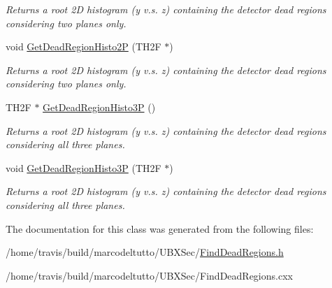 \begin{DoxyCompactItemize}
\begin{DoxyCompactList}\small\item\em \-Returns a root 2\-D histogram (y v.\-s. z) containing the detector dead regions considering two planes only. \end{DoxyCompactList}\item 
\hypertarget{classFindDeadRegions_a93fcf74bb534831495f50a79fede19f9}{void \hyperlink{classFindDeadRegions_a93fcf74bb534831495f50a79fede19f9}{\-Get\-Dead\-Region\-Histo2\-P} (\-T\-H2\-F $\ast$)}\label{classFindDeadRegions_a93fcf74bb534831495f50a79fede19f9}

\begin{DoxyCompactList}\small\item\em \-Returns a root 2\-D histogram (y v.\-s. z) containing the detector dead regions considering two planes only. \end{DoxyCompactList}\item 
\hypertarget{classFindDeadRegions_abb378991861e7fdef4cd94a27d52ec07}{\-T\-H2\-F $\ast$ \hyperlink{classFindDeadRegions_abb378991861e7fdef4cd94a27d52ec07}{\-Get\-Dead\-Region\-Histo3\-P} ()}\label{classFindDeadRegions_abb378991861e7fdef4cd94a27d52ec07}

\begin{DoxyCompactList}\small\item\em \-Returns a root 2\-D histogram (y v.\-s. z) containing the detector dead regions considering all three planes. \end{DoxyCompactList}\item 
\hypertarget{classFindDeadRegions_a50de57c6d1792a6f2a93df8a44ba840a}{void \hyperlink{classFindDeadRegions_a50de57c6d1792a6f2a93df8a44ba840a}{\-Get\-Dead\-Region\-Histo3\-P} (\-T\-H2\-F $\ast$)}\label{classFindDeadRegions_a50de57c6d1792a6f2a93df8a44ba840a}

\begin{DoxyCompactList}\small\item\em \-Returns a root 2\-D histogram (y v.\-s. z) containing the detector dead regions considering all three planes. \end{DoxyCompactList}\end{DoxyCompactItemize}


\-The documentation for this class was generated from the following files\-:\begin{DoxyCompactItemize}
\item 
/home/travis/build/marcodeltutto/\-U\-B\-X\-Sec/\hyperlink{FindDeadRegions_8h}{\-Find\-Dead\-Regions.\-h}\item 
/home/travis/build/marcodeltutto/\-U\-B\-X\-Sec/\-Find\-Dead\-Regions.\-cxx\end{DoxyCompactItemize}
